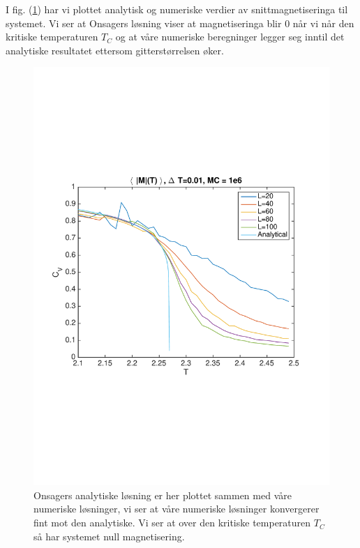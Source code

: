 \documentclass[norsk, 10pt]{article}
\begin{document}
I fig. (\ref{fig:avgmagnumanal}) har vi plottet analytisk og numeriske verdier av snittmagnetiseringa til systemet. Vi ser at Onsagers løsning viser at magnetiseringa blir 0 når vi når den kritiske temperaturen $T_C$ og at våre numeriske beregninger legger seg inntil det analytiske resultatet ettersom gitterstørrelsen øker.

\begin{figure}[H]
	\centering
	\includegraphics[scale = 0.6, trim = 1cm 8cm 1cm 8cm]{avg_mag_num_anal.pdf}
	\caption{Onsagers analytiske løsning er her plottet sammen med våre numeriske løsninger, vi ser at våre numeriske løsninger konvergerer fint mot den analytiske. Vi ser at over den kritiske temperaturen $T_C$ så har systemet null magnetisering.}
	\label{fig:avgmagnumanal}
\end{figure}
\end{document}
